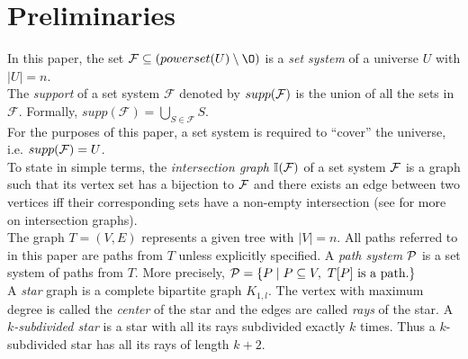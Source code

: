 \documentclass{llncs}
\def\cF{{\cal F}}
\def\cP{{\cal P}}
\def\F{{\mathcal F}}
\def\bI{\mathbb I}
\newcommand{\rcomment}[1]{}
\begin{document}
\section{Preliminaries} \label{prelims} 
\noindent
In this paper, the set $\F \subseteq (powerset(U) \setminus \O)$ is a
{\em set system} of a universe $U$ with $|U| = n$. \\

\noindent
The {\em support} of a set system $\F$ denoted by  $supp(\cF)$ is the
union of all the sets in $\F$. Formally, $supp(\F) =
\bigcup_{S \in \F}S$.\\

\noindent
For the purposes of this paper, a set system is required to ``cover'' the universe,
i.e. $ supp(\cF) = U$. \\


\noindent
To state in simple terms, the {\em intersection graph} $\bI(\cF)$ of a
set system $\cF$ is a graph such that its vertex set has a bijection
to $\cF$ and there exists an edge between two vertices iff their
corresponding sets have a non-empty
intersection (see \cite{mcg04} for more on intersection graphs). \\


\noindent
The graph $T=(V,E)$ represents a given tree with $|V| = n$. 
All paths
referred to in this paper are paths from $T$ unless explicitly
specified. A {\em path system} $\cP$ is a set system of paths from
$T$. More precisely, $\cP = \{P \mid P \subseteq V, \text{ } T[P]
\text{ is a path.} \}$\\



\noindent
A {\em star} graph is a complete bipartite graph
$K_{1,l}$. The vertex with maximum degree is called the {\em center} of
the star and the edges are called {\em rays} of the star.
A {\em $k$-subdivided star} is a star with all its rays subdivided exactly
$k$ times. Thus a $k$-subdivided star has all its rays of length $k+2$.
\end{document}
